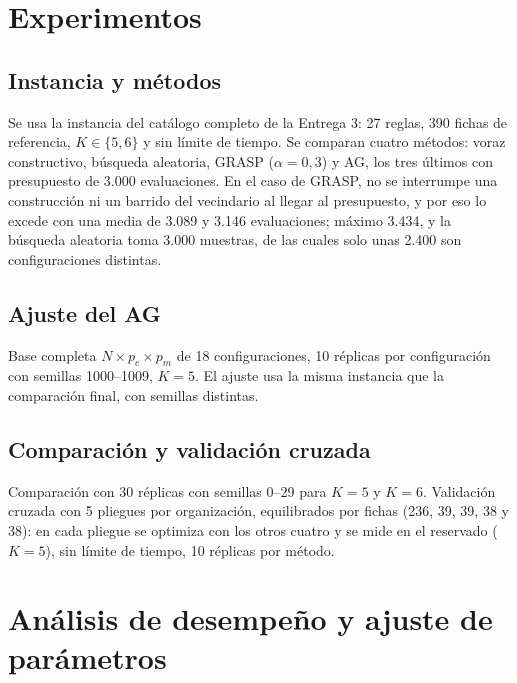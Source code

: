 \documentclass[conference]{IEEEtran}
\begin{document}
	\section{Experimentos}
	
	\subsection{Instancia y m\'etodos}
	Se usa la instancia del cat\'alogo completo de la Entrega 3: 27 reglas, 390 fichas de referencia, $K\in\{5,6\}$ y sin l\'imite de tiempo. Se comparan cuatro m\'etodos: voraz constructivo, b\'usqueda aleatoria, GRASP ($\alpha=0{,}3$) y AG, los tres \'ultimos con presupuesto de 3.000 evaluaciones. En el caso de GRASP, no se interrumpe una construcción ni un barrido del vecindario al llegar al presupuesto, y por eso lo excede con una media de 3.089 y 3.146 evaluaciones; m\'aximo 3.434, y la b\'usqueda aleatoria toma 3.000 muestras, de las cuales solo unas 2.400 son configuraciones distintas.
	
	\subsection{Ajuste del AG}
	Base completa $N\times p_c\times p_m$ de 18 configuraciones, 10 r\'eplicas por configuraci\'on con semillas 1000--1009, $K=5$. El ajuste usa la misma instancia que la comparaci\'on final, con semillas distintas.
	
	\subsection{Comparaci\'on y validaci\'on cruzada}
	Comparaci\'on con 30 r\'eplicas con semillas 0--29 para $K=5$ y $K=6$. Validaci\'on cruzada con 5 pliegues por organizaci\'on, equilibrados por fichas (236, 39, 39, 38 y 38): en cada pliegue se optimiza con los otros cuatro y se mide en el reservado ($K=5$), sin l\'imite de tiempo, 10 r\'eplicas por m\'etodo.
	
	\section{An\'alisis de desempe\~no y ajuste de par\'ametros}
	
\end{document}
